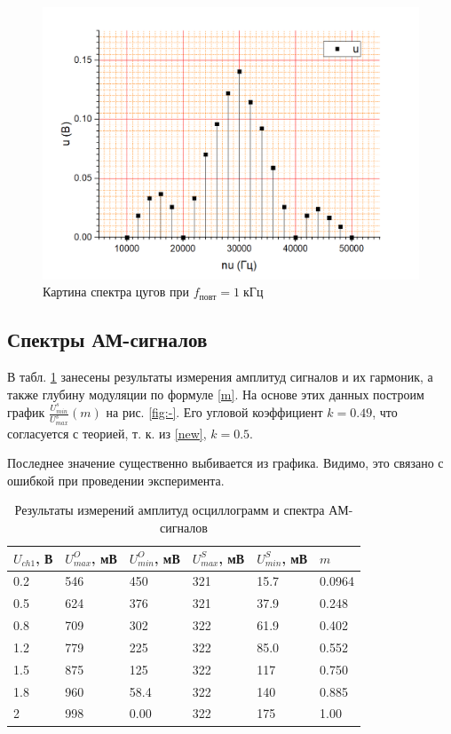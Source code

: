 \documentclass[a4paper]{article}
\begin{document}
\begin{figure}[p]
	\centering
	\includegraphics[width=0.8\linewidth]{"2000 hz zug"}
	\caption{Картина спектра цугов при $f_{повт} = 1\; кГц$}
	\label{fig:2000-hz-zug}
\end{figure}

\subsection{Спектры АМ-сигналов}
\label{punkt}
В табл. \ref{tab:amp} занесены результаты измерения амплитуд сигналов и их гармоник, а также глубину модуляции по формуле \eqref{m}. На основе этих данных построим график $ \frac{U_{min}^s}{U_{max}^s}(m) $ на рис. \ref{fig:-}. Его угловой коэффициент $ k= 0.49 $, что согласуется с теорией, т. к. из \eqref{new}, $ k = 0.5 $. 

Последнее значение существенно выбивается из графика. Видимо, это связано с ошибкой при проведении эксперимента.

\begin{table}[h]
	\centering
	\begin{tabular}{|l|l|l|l|l|l|}
		\hline
		$U_{ch1}$, В & $U_{max}^O$, мВ & $U_{min}^O$, мВ & $U_{max}^S$, мВ & $U_{min}^S$, мВ & $m$    \\ \hline
		0.2          & 546             & 450             & 321             & 15.7            & 0.0964 \\ \hline
		0.5          & 624             & 376             & 321             & 37.9            & 0.248  \\ \hline
		0.8          & 709             & 302             & 322             & 61.9            & 0.402  \\ \hline
		1.2          & 779             & 225             & 322             & 85.0            & 0.552  \\ \hline
		1.5          & 875             & 125             & 322             & 117             & 0.750  \\ \hline
		1.8          & 960             & 58.4            & 322             & 140             & 0.885  \\ \hline
		2            & 998             & 0.00            & 322             & 175             & 1.00   \\ \hline
	\end{tabular}
	\caption{Результаты измерений амплитуд осциллограмм и спектра АМ-сигналов}
	\label{tab:amp}
\end{table}
\end{document}
